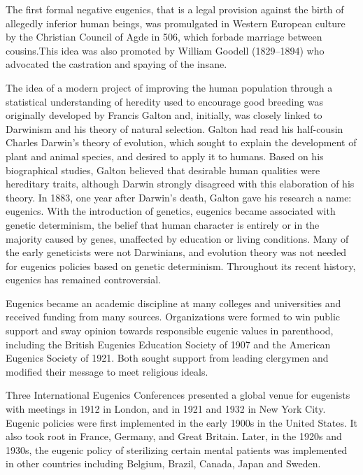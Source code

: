 The first formal negative eugenics, that is a legal provision against the birth of allegedly inferior human beings, was promulgated in Western European culture by the Christian Council of Agde in 506, which forbade marriage between cousins.This idea was also promoted by William Goodell (1829--1894) who advocated the castration and spaying of the insane.

The idea of a modern project of improving the human population through a statistical understanding of heredity used to encourage good breeding was originally developed by Francis Galton and, initially, was closely linked to Darwinism and his theory of natural selection. Galton had read his half-cousin Charles Darwin's theory of evolution, which sought to explain the development of plant and animal species, and desired to apply it to humans. Based on his biographical studies, Galton believed that desirable human qualities were hereditary traits, although Darwin strongly disagreed with this elaboration of his theory. In 1883, one year after Darwin's death, Galton gave his research a name: eugenics. With the introduction of genetics, eugenics became associated with genetic determinism, the belief that human character is entirely or in the majority caused by genes, unaffected by education or living conditions. Many of the early geneticists were not Darwinians, and evolution theory was not needed for eugenics policies based on genetic determinism. Throughout its recent history, eugenics has remained controversial.

Eugenics became an academic discipline at many colleges and universities and received funding from many sources. Organizations were formed to win public support and sway opinion towards responsible eugenic values in parenthood, including the British Eugenics Education Society of 1907 and the American Eugenics Society of 1921. Both sought support from leading clergymen and modified their message to meet religious ideals.

Three International Eugenics Conferences presented a global venue for eugenists with meetings in 1912 in London, and in 1921 and 1932 in New York City. Eugenic policies were first implemented in the early 1900s in the United States. It also took root in France, Germany, and Great Britain. Later, in the 1920s and 1930s, the eugenic policy of sterilizing certain mental patients was implemented in other countries including Belgium, Brazil, Canada, Japan and Sweden.

